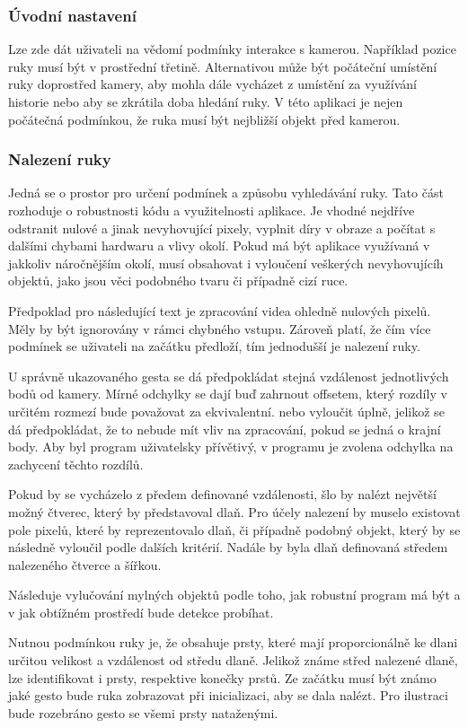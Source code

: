 \subsubsection{Úvodní nastavení}
Lze zde dát uživateli na vědomí podmínky interakce s kamerou. Například pozice ruky musí být v prostřední třetině. Alternativou může být počáteční umístění ruky doprostřed kamery, aby mohla dále vycházet z umístění za využívání historie nebo aby se zkrátila doba hledání ruky. V této aplikaci je nejen počátečná podmínkou, že ruka musí být nejbližší objekt před kamerou.

\subsubsection{Nalezení ruky}
Jedná se o prostor pro určení podmínek a způsobu vyhledávání ruky. Tato část rozhoduje o robustnosti kódu a využitelnosti aplikace. Je vhodné nejdříve odstranit nulové a jinak nevyhovující pixely, vyplnit díry v obraze a počítat s dalšími chybami hardwaru a vlivy okolí. Pokud má být aplikace využívaná v jakkoliv náročnějším okolí, musí obsahovat i vyloučení veškerých nevyhovujícíh objektů, jako jsou věci podobného tvaru či případně cizí ruce.

Předpoklad pro následující text je zpracování videa ohledně nulových pixelů. Měly by být ignorovány v rámci chybného vstupu. Zároveň platí, že čím více podmínek se uživateli na začátku předloží, tím jednodušší je nalezení ruky. 

U správně ukazovaného gesta se dá předpokládat stejná vzdálenost jednotlivých bodů od kamery. Mírné odchylky se dají buď zahrnout offsetem, který rozdíly v určitém rozmezí bude považovat za ekvivalentní. nebo vyloučit úplně, jelikož se dá předpokládat, že to nebude mít vliv na zpracování, pokud se jedná o krajní body. Aby byl program uživatelsky přívětivý, v programu je zvolena odchylka na zachycení těchto rozdílů.

Pokud by se vycházelo z předem definované vzdálenosti, šlo by nalézt největší možný čtverec, který by představoval dlaň. Pro účely nalezení by muselo existovat pole pixelů, které by reprezentovalo dlaň, či případně podobný objekt, který by se následně vyloučil podle dalších kritérií. Nadále by byla dlaň definovaná středem nalezeného čtverce a šířkou.

Následuje vylučování mylných objektů podle toho, jak robustní program má být a v jak obtížném prostředí bude detekce probíhat.

Nutnou podmínkou ruky je, že obsahuje prsty, které mají proporcionálně ke dlani určitou velikost a vzdálenost od středu dlaně. Jelikož známe střed nalezené dlaně, lze identifikovat i prsty, respektive konečky prstů. Ze začátku musí být známo jaké gesto bude ruka zobrazovat při inicializaci, aby se dala nalézt. Pro ilustraci bude rozebráno gesto se všemi prsty nataženými. 

